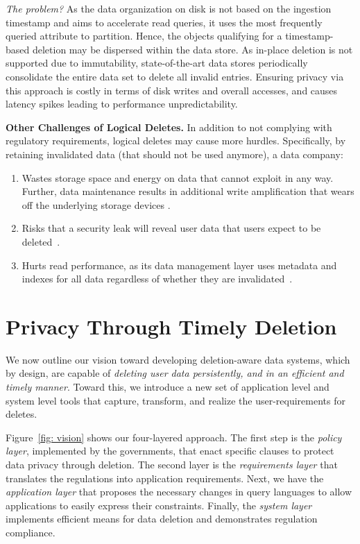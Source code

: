 \documentclass[11pt,dvipdfmx]{article}
\newcommand\Paragraph[1]{\vspace{0.02in}  \noindent \textbf{#1.}}
\newcommand\Paragraphqit[1]{\vspace{0.02in}  \noindent \textit{#1?}}
\begin{document}
\Paragraphqit{The problem} As the data organization on disk is not based on the ingestion timestamp and aims to accelerate read queries, it uses the most frequently
queried attribute to partition. Hence, the objects qualifying for a timestamp-based
deletion may be dispersed within the data store. 
As in-place deletion is not supported due to immutability, state-of-the-art data stores periodically consolidate the entire data set to delete all invalid entries. 
Ensuring privacy via this approach is costly in terms of disk writes and overall accesses, and causes latency spikes leading to performance unpredictability. 

\Paragraph{Other Challenges of Logical Deletes} In addition to not complying with regulatory requirements, 
logical deletes may cause more hurdles. Specifically,
by retaining invalidated data (that should not be used anymore), a data company:

\begin{enumerate}
	\item Wastes storage space and energy on data that cannot exploit in any way. Further, data maintenance results in additional write amplification that wears off the underlying storage devices \cite{Athanassoulis2016}.
	\item Risks that a security leak will reveal user data that users expect to be deleted~\cite{Piper2022}.
	\item Hurts read performance, as its data management layer uses metadata and indexes for all data regardless of whether they are invalidated~\cite{Sarkar2020}.
\end{enumerate}






\newpage 
\section{Privacy Through Timely Deletion}
\label{sec:vision}


We now outline our vision toward developing deletion-aware data systems, which by design, are capable of \emph{deleting user data persistently, and in an efficient and timely manner}. 
Toward this, we introduce a new set of application level and system level tools that capture, transform, and realize the user-requirements for deletes. 

Figure~\ref{fig: vision} shows our four-layered approach. The first step is the
\textit{policy layer}, implemented by the governments, that enact specific clauses to protect
data privacy through deletion. The second layer is the \emph{requirements layer} that 
translates the regulations into application requirements. Next, we have the \emph{application
layer} that proposes the necessary changes in query languages to allow applications to
easily express their constraints. Finally, the \emph{system
layer} implements efficient means for data deletion and demonstrates regulation compliance.
\end{document}
